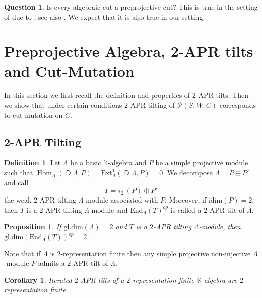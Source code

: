 \documentclass[a4paper, reqno]{amsart}
\newtheorem{myprop}[mythm]{Proposition}
\newtheorem{mycor}[mythm]{Corollary}
\theoremstyle{definition}
\newtheorem{mydef}[mythm]{Definition}
\newtheorem{myquestion}[mythm]{Question}
\newcommand{\K}{\mathbb{K}}
\DeclareMathOperator{\Hom}{\mathrm{Hom}}
\DeclareMathOperator{\DD}{\mathsf{D}}
\begin{document}
\begin{myquestion}
	Is every algebraic cut a preprojective cut? This is true in the setting of \cite{HerschendOsamu2011quiverwithpotential} due to \cite{Keller2011CYcompletions}, see also \cite{HerschendOsamu2011quiverwithpotential}. We expect that it is also true in our setting.
\end{myquestion}

\section{Preprojective Algebra, 2-APR tilts and Cut-Mutation}\label{Section - Preproj, 2apr and cutmutation}
In this section we first recall the definition and properties of $2$-APR tilts. Then we show that under certain conditions $2$-APR tilting of $\mathcal{P}(S, W, C)$ corresponds to cut-mutation on $C$.

\subsection{2-APR Tilting}
\begin{mydef}\cite[Definition 3.1]{IO11nRFalgandnAPRtilt}\label{definition - d-apr tilting module}
	Let $\Lambda$ be a basic $\K$-algebra and $P$ be a simple projective module such that $\Hom_\Lambda(\DD\Lambda, P) = \mathrm{Ext}_\Lambda^1(\DD\Lambda, P) = 0$. We decompose $\Lambda = P\oplus P'$ and call
	\begin{equation*}
		T = \tau_2^-(P)\oplus P'
	\end{equation*}
	the weak $2$-APR tilting $\Lambda$-module associated with $P$. Moreover, if $\mathrm{idim}(P) = 2$, then $T$ is a $2$-APR tilting $\Lambda$-module and $\mathrm{End}_\Lambda(T)^{op}$ is called a $2$-APR tilt of $\Lambda$.
\end{mydef}

\begin{myprop}\cite[Proposition 3.6]{IO11nRFalgandnAPRtilt}
	If $\mathrm{gl.dim}(\Lambda) = 2$ and $T$ is a $2$-APR tilting $\Lambda$-module, then $\mathrm{gl.dim}(\mathrm{End}_\Lambda(T))^{op} = 2$.
\end{myprop}

Note that if $\Lambda$ is $2$-representation finite then any simple projective non-injective $\Lambda$-module $P$ admits a $2$-APR tilt of $\Lambda$.

\begin{mycor}\cite[Corollary 4.3]{IO11nRFalgandnAPRtilt}
	Iterated $2$-APR tilts of a $2$-representation finite $\K$-algebra are $2$-representation finite.
\end{mycor}
\end{document}
